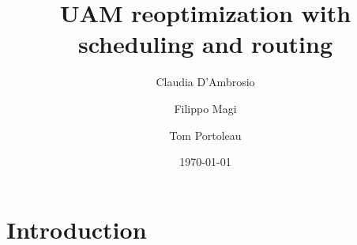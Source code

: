 \documentclass{article}
\title{UAM reoptimization with scheduling and routing}
\author{Claudia D'Ambrosio \and Filippo Magi \and Tom Portoleau}
\date{\today}
\begin{document}
\maketitle

\section{Introduction}
\end{document}
